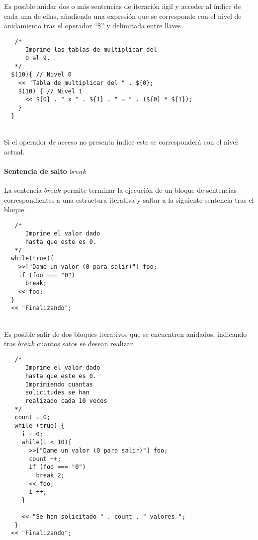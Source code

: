 Es posible anidar dos o más sentencias de iteración ágil y acceder al índice de cada una de ellas, añadiendo una expresión que se corresponde con el nivel de
anidamiento tras el operador ``\$'' y delimitada entre llaves. \\


\begin{lstlisting}
   /*
      Imprime las tablas de multiplicar del 
      0 al 9.
   */
  $(10){ // Nivel 0
    << "Tabla de multiplicar del " . ${0};
    $(10) { // Nivel 1
      << ${0} . " x " . ${1} . " = " . (${0} * ${1}); 
    }
  }
\end{lstlisting}
\hfill\\

Si el operador de acceso no presenta índice este se corresponderá con el nivel actual.



\paragraph{Sentencia de salto $break$} \label{sec:stmt_break}
La sentencia $break$ permite terminar la ejecución de un bloque de sentencias correspondientes a una estructura iterativa y saltar a la siguiente sentencia tras el bloque. \\

\begin{lstlisting}
   /*
      Imprime el valor dado
      hasta que este es 0.
   */
  while(true){
    >>["Dame un valor (0 para salir)"] foo;
    if (foo === "0")
      break;
    << foo;
  }
  << "Finalizando";
\end{lstlisting}
\hfill\\

Es posible salir de dos bloques iterativos que se encuentren anidados, indicando tras $break$ cuantos satos se desean realizar. \\

\begin{lstlisting}
   /*
      Imprime el valor dado
      hasta que este es 0.
      Imprimiendo cuantas 
      solicitudes se han 
      realizado cada 10 veces
   */
   count = 0;
   while (true) {
     i = 0;
     while(i < 10){
       >>["Dame un valor (0 para salir)"] foo;
       count ++;
       if (foo === "0")
         break 2;
       << foo;
       i ++;
     }
     
     << "Se han solicitado " . count . " valores ";
   }
  << "Finalizando";
\end{lstlisting} 
\hfill\\

